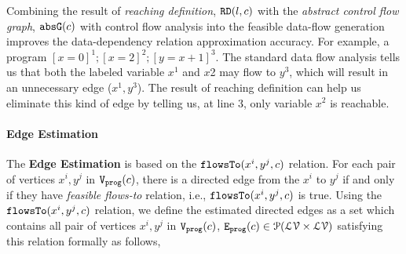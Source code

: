 Combining the result of \emph{reaching definition}, $\mathtt{RD}(l, c)$
with the \emph{abstract control flow graph}, $\mathtt{abs}{\mathtt{G}}(c)$ with control flow analysis into the feasible 
data-flow generation improves the data-dependency relation approximation accuracy. 
For example, a program $ [x = 0]^{1}; [x=2]^{2};  [y = x+1]^{3}$. 
The standard data flow analysis 
tells us that both the labeled variable $x^{1}$ and $x${2} may flow to $y^{3}$, which will result in an unnecessary edge ($x^{1}, y^{3}$). The result of reaching definition 
can help us eliminate this kind of edge by telling us, at line $3$, only variable $x^{2}$ is reachable. 
\paragraph{Edge Estimation}
The \textbf{Edge Estimation}
is based on the $\mathtt{flowsTo}(x^i, y^j, c)$ relation.
For each pair of vertices $x^i, y^j$ in $\mathtt{{V_{prog}}}(c)$,
there is a directed edge from the $x^i$ to $y^j$ if and only if they have
\emph{feasible flows-to} relation, i.e., $\mathtt{flowsTo}(x^i, y^j, c)$ is true.
Using the $\mathtt{flowsTo}(x^i, y^j, c)$ relation, we define the estimated directed edges as a set which contains all
pair of vertices $x^i, y^j$ in $\mathtt{{V_{prog}}}(c)$, 
$\mathtt{{E_{prog}}}(c) \in \mathcal{P}( \mathcal{LV} \times \mathcal{LV})$
satisfying this relation formally as follows,
